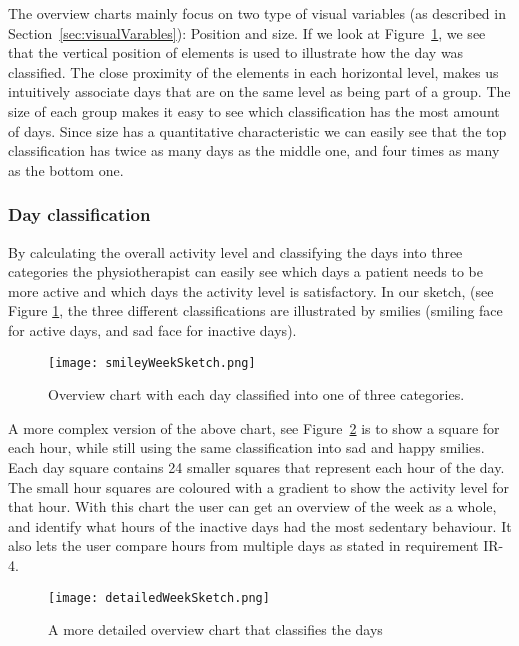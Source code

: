 The overview charts mainly focus on two type of visual variables (as described in Section~\ref{sec:visualVarables}): Position and size. If we look at Figure~\ref{fig:smileyWeek}, we see that the vertical position of elements is used to illustrate how the day was classified. The close proximity of the elements in each horizontal level, makes us intuitively associate days that are on the same level as being part of a group. The size of each group makes it easy to see which classification has the most amount of days. Since size has a quantitative characteristic we can easily see that the top classification has twice as many days as the middle one, and four times as many as the bottom one.

\subsubsection{Day classification}
By calculating the overall activity level and classifying the days into three categories the physiotherapist can easily see which days a patient needs to be more active and which days the activity level is satisfactory. In our sketch, (see Figure \ref{fig:smileyWeek}, the three different classifications are illustrated by smilies (smiling face for active days, and sad face for inactive days).

\begin{figure}[h!]
	\centering
		\texttt{[image: smileyWeekSketch.png]}
		\caption[U1 sketch]{Overview chart with each day classified into one of three categories.}
		\label{fig:smileyWeek}
\end{figure}

A more complex version of the above chart, see Figure~\ref{fig:detailedWeek} is to show a square for each hour, while still using the same classification into sad and happy smilies. Each day square contains 24 smaller squares that represent each hour of the day. The small hour squares are coloured with a gradient to show the activity level for that hour. With this chart the user can get an overview of the week as a whole, and identify what hours of the inactive days had the most sedentary behaviour. It also lets the user compare hours from multiple days as stated in requirement IR-4.

\begin{figure}[h!]
	\centering
		\texttt{[image: detailedWeekSketch.png]}
		\caption[U2 sketch]{A more detailed overview chart that classifies the days}
		\label{fig:detailedWeek}
\end{figure}

